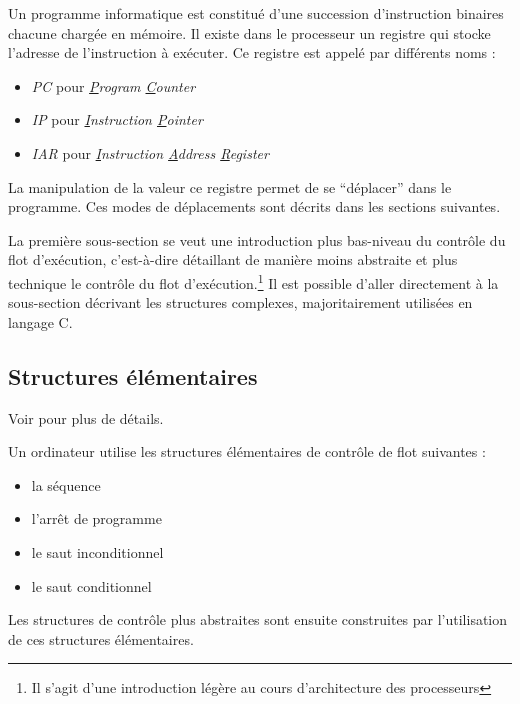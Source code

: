 \documentclass[../../../main.tex]{subfiles}
\begin{document}

Un programme informatique est constitué d'une succession d'instruction binaires chacune chargée en mémoire. Il existe dans le processeur un registre qui stocke l'adresse de l'instruction à exécuter.\newline
Ce registre est appelé par différents noms :
\begin{itemize}
	\item \textit{PC} pour \textit{\underline{P}rogram \underline{C}ounter}
	\item \textit{IP} pour \textit{\underline{I}nstruction \underline{P}ointer}
	\item \textit{IAR} pour \textit{\underline{I}nstruction \underline{A}ddress \underline{R}egister}
\end{itemize}
La manipulation de la valeur ce registre permet de se ``déplacer'' dans le programme. Ces modes de déplacements sont décrits dans les sections suivantes.
 
\begin{minipage}{\textwidth}
	\begin{center}
		
	\end{center}
\end{minipage}
 
La première sous-section se veut une introduction plus bas-niveau du contrôle du flot d'exécution, c'est-à-dire détaillant de manière moins abstraite et plus technique le contrôle du flot d'exécution.\footnote{Il s'agit d'une introduction légère au cours d'architecture des processeurs} Il est possible d'aller directement à la sous-section décrivant les structures complexes, majoritairement utilisées en langage C.
\subsection{Structures élémentaires}
Voir \cite{CSaPP} pour plus de détails.

Un ordinateur utilise les structures élémentaires de contrôle de flot suivantes :
\begin{itemize}
	\item la séquence
	\item l'arrêt de programme
	\item le saut inconditionnel
	\item le saut conditionnel
\end{itemize}
Les structures de contrôle plus abstraites sont ensuite construites par l'utilisation de ces structures élémentaires.
 
\end{document}
